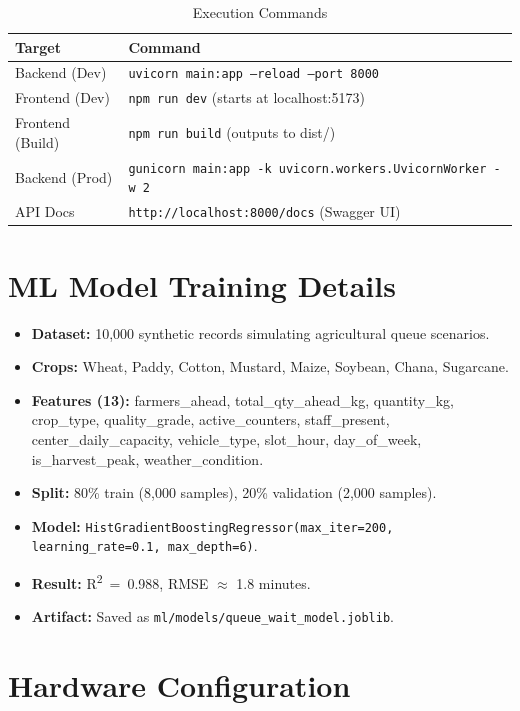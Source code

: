 \begin{table}[h!]
\centering
\caption{Execution Commands}
\label{tab:exec}
\renewcommand{\arraystretch}{1.2}
\begin{tabular}{|p{4cm}|p{9.5cm}|}
\hline
\textbf{Target} & \textbf{Command} \\ \hline
Backend (Dev) & \texttt{uvicorn main:app --reload --port 8000} \\ \hline
Frontend (Dev) & \texttt{npm run dev} (starts at localhost:5173) \\ \hline
Frontend (Build) & \texttt{npm run build} (outputs to dist/) \\ \hline
Backend (Prod) & \texttt{gunicorn main:app -k uvicorn.workers.UvicornWorker -w 2} \\ \hline
API Docs & \texttt{http://localhost:8000/docs} (Swagger UI) \\ \hline
\end{tabular}
\end{table}

\section{ML Model Training Details}
\begin{itemize}
  \item \textbf{Dataset:} 10,000 synthetic records simulating agricultural queue scenarios.
  \item \textbf{Crops:} Wheat, Paddy, Cotton, Mustard, Maize, Soybean, Chana, Sugarcane.
  \item \textbf{Features (13):} farmers\_ahead, total\_qty\_ahead\_kg, quantity\_kg, crop\_type, quality\_grade, active\_counters, staff\_present, center\_daily\_capacity, vehicle\_type, slot\_hour, day\_of\_week, is\_harvest\_peak, weather\_condition.
  \item \textbf{Split:} 80\% train (8,000 samples), 20\% validation (2,000 samples).
  \item \textbf{Model:} \texttt{HistGradientBoostingRegressor(max\_iter=200, learning\_rate=0.1, max\_depth=6)}.
  \item \textbf{Result:} R\textsuperscript{2}~=~0.988, RMSE $\approx$ 1.8 minutes.
  \item \textbf{Artifact:} Saved as \texttt{ml/models/queue\_wait\_model.joblib}.
\end{itemize}

\section{Hardware Configuration}

